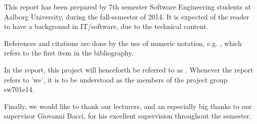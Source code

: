 This report has been prepared by 7th semester Software Engineering students at Aalborg University, during the fall-semester of 2014.
It is expected of the reader to have a background in IT/software, due to the technical content.

References and citations are done by the use of numeric notation, e.g. \cite{aalborgbycyklenbagcyklen}, which refers to the first item in the bibliography.

In the report, this project will henceforth be referred to as \projectname.
Whenever the report refers to 'we', it is to be understood as the members of the project group sw701e14.

Finally, we would like to thank our lecturers, and an especially big thanks to our supervisor Giovanni Bacci, for his excellent supervision throughout the semester.
